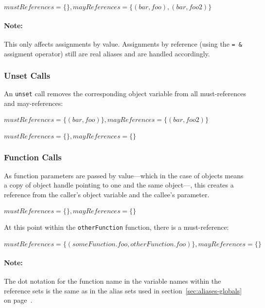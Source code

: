 $mustReferences = \{\}, mayReferences = \{(bar, foo), (bar, foo2)\}$

\paragraph{Note:} This only affects assignments by value. Assignments by reference (using the \texttt{=~\&} assigment operator) still are real aliases and are handled accordingly.


\subsubsection{Unset Calls}

An \texttt{unset} call removes the corresponding object variable from all must-references and may-references:

$mustReferences = \{(bar, foo)\}, mayReferences = \{(bar, foo2)\}$


$mustReferences = \{\}, mayReferences = \{\}$


\subsubsection{Function Calls}

As function parameters are passed by value---which in the case of objects means a copy of object handle pointing to one and the same object---, this creates a reference from the caller's object variable and the callee's parameter.

$mustReferences = \{\}, mayReferences = \{\}$

\begin{phpcode}
function someFunction() {
  $foo = new Foo();
  otherFunction(foo);
}

function otherFunction(Foo $foo) {
\end{phpcode}

At this point within the \texttt{otherFunction} function, there is a must-reference:

$mustReferences = \{(someFunction.foo, otherFunction.foo)\}, mayReferences = \{\}$

\paragraph{Note:} The dot notation for the function name in the variable names within the reference sets is the same as in the alias sets used in section~\ref{sec:aliases-globals} on page~\pageref{sec:aliases-globals}.



